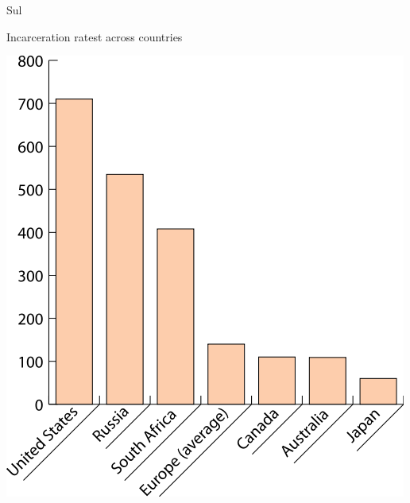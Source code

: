 \documentclass[print,Draft]{faosyb}
\begin{document}
\lipsum[1-15]

\begin{chart}{S}{ul}
\caption{Incarceration ratest across countries}
\label{chart:incarceration}
\includegraphics[width=\chartwidth,height=\chartheight]{incarceration}  
\end{chart}
\end{document}
